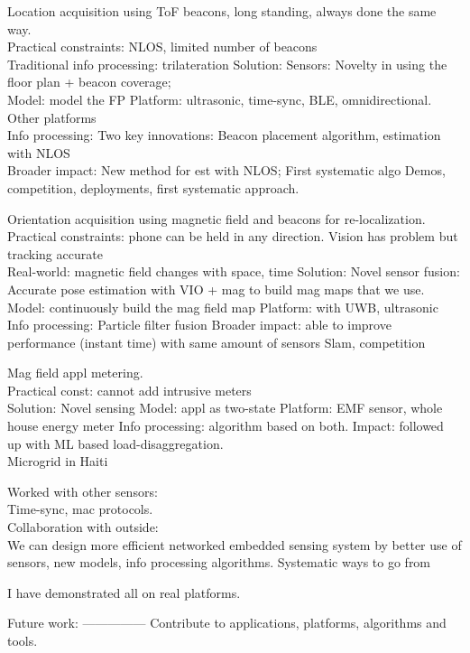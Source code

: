 \documentclass[10pt]{article}
\begin{document}
Location acquisition using ToF beacons, long standing, always done the same way.\\
Practical constraints: NLOS, limited number of beacons\\
Traditional info processing: trilateration 
Solution:
Sensors: Novelty in using the floor plan + beacon coverage;\\
Model: model the FP
Platform: ultrasonic, time-sync, BLE, omnidirectional. Other platforms\\
Info processing: Two key innovations: Beacon placement algorithm, estimation with NLOS\\
Broader impact:
New method for est with NLOS;
First systematic algo 
Demos, competition, deployments, first systematic approach.

Orientation acquisition using magnetic field and beacons for re-localization.\\
Practical constraints: phone can be held in any direction. Vision has problem but tracking accurate\\
Real-world: magnetic field changes with space, time
Solution:
Novel sensor fusion: Accurate pose estimation with VIO + mag to build mag maps that we use.\\
Model: continuously build the mag field map
Platform: with UWB, ultrasonic
Info processing: 
Particle filter fusion
Broader impact: 
able to improve performance (instant time) with same amount of sensors
Slam, competition

Mag field appl metering.\\
Practical const: cannot add intrusive meters\\
Solution: Novel sensing
Model: appl as two-state
Platform: EMF sensor, whole house energy meter
Info processing: algorithm based on both.
Impact: followed up with ML based load-disaggregation.\\
Microgrid in Haiti

Worked with other sensors:\\
Time-sync, mac protocols.\\
Collaboration with outside:\\

We can design more efficient networked embedded sensing system by better use of sensors, new models, info processing algorithms. Systematic ways to go from 

I have demonstrated all on real platforms.


Future work: ---------------
Contribute to applications, platforms, algorithms and tools. \\
\end{document}
